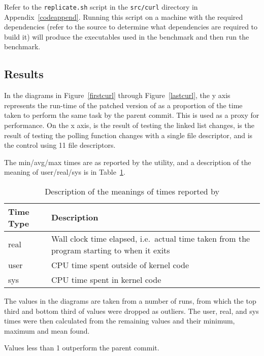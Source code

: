 Refer to the \texttt{replicate.sh} script in the \texttt{src/curl} directory in Appendix~\ref{codeappend}. Running this script on a machine with the required dependencies (refer to the  source to determine what dependencies are required to build it) will produce the executables used in the benchmark and then run the benchmark.

\subsection{Results}

In the diagrams in Figure~\ref{firstcurl} through Figure~\ref{lastcurl}, the y axis represents the run-time of the patched version of  as a proportion of the time taken to perform the same task by the parent commit. This is used as a proxy for performance. On the x axis,  is the result of testing the linked list changes,  is the result of testing the polling function changes with a single file descriptor, and  is the control using 11 file descriptors.

The min/avg/max times are as reported by the  utility, and a description of the meaning of user/real/sys is in Table~\ref{timestable}.

\begin{table}
	\centering
	\begin{tabularx}{\linewidth}{>{\hsize=0.6\hsize}X >{\hsize=1.4\hsize}X}
		\toprule
		\textbf{Time Type} & \textbf{Description} \\
		\midrule
		real & Wall clock time elapsed, i.e.\ actual time taken from the program starting to when it exits \\
		user & CPU time spent outside of kernel code \\
		sys & CPU time spent in kernel code \\
		\bottomrule
	\end{tabularx}
	\caption{Description of the meanings of times reported by }\label{timestable}
\end{table}

The values in the diagrams are taken from a number of runs, from which the top third and bottom third of values were dropped as outliers. The user, real, and sys times were then calculated from the remaining values and their minimum, maximum and mean found.

Values less than 1 outperform the parent commit.

